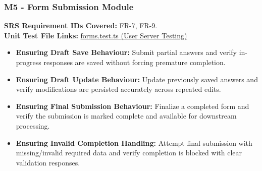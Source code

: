 \documentclass[12pt, titlepage]{article}
\begin{document}
\subsubsection{M5 - Form Submission Module}
\textbf{SRS Requirement IDs Covered:} FR-7, FR-9.
\\
\textbf{Unit Test File Links:} \href{https://github.com/VirochaanRG/MES-Event-Management-System/blob/main/test/Server%20API%20Testing/User%20Server%20Testing/forms.test.ts}{forms.test.ts (User Server Testing)}
\begin{itemize}
  \item \textbf{Ensuring Draft Save Behaviour:} Submit partial answers and verify in-progress responses are saved without forcing premature completion.
  \item \textbf{Ensuring Draft Update Behaviour:} Update previously saved answers and verify modifications are persisted accurately across repeated edits.
  \item \textbf{Ensuring Final Submission Behaviour:} Finalize a completed form and verify the submission is marked complete and available for downstream processing.
  \item \textbf{Ensuring Invalid Completion Handling:} Attempt final submission with missing/invalid required data and verify completion is blocked with clear validation responses.
\end{itemize}
\end{document}
